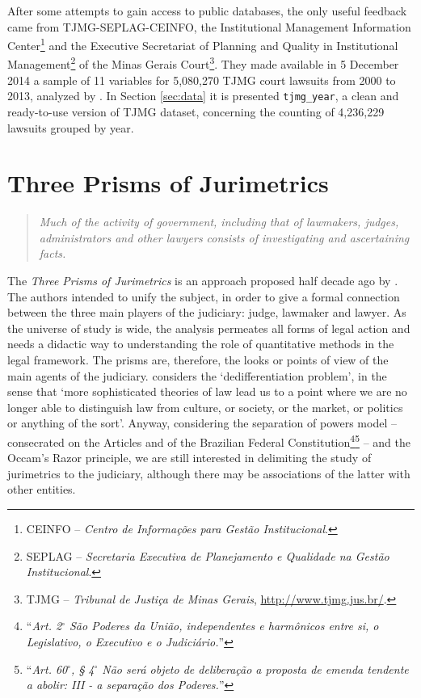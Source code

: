 \documentclass[a4paper]{exam}
\theoremstyle{plain}
\begin{document}
After some attempts to gain access to public databases, the only useful feedback came from TJMG-SEPLAG-CEINFO, the Institutional Management Information Center\footnote{ CEINFO -- \textit{Centro de Informações para Gestão Institucional}.} and the Executive Secretariat of Planning and Quality in Institutional Management\footnote{ SEPLAG -- \textit{Secretaria Executiva de Planejamento e Qualidade na Gestão Institucional}.} of the Minas Gerais Court\footnote{ TJMG -- \textit{Tribunal de Justiça de Minas Gerais}, \url{http://www.tjmg.jus.br/}.}. They made available in 5 December 2014 a sample of 11 variables for 5,080,270 TJMG court lawsuits from 2000 to 2013, analyzed by \cite{oliveira2014jurimetria}. In Section \ref{sec:data} it is presented \texttt{tjmg\_year}, a clean and ready-to-use version of TJMG dataset, concerning the counting of 4,236,229 lawsuits grouped by year.

\section{Three Prisms of Jurimetrics}

\begin{quote}
\textit{Much of the activity of government, including that of lawmakers, judges, administrators and other lawyers consists of investigating and ascertaining facts.} \cite[p. 535]{loevinger1966law}
\end{quote}

The \textit{Three Prisms of Jurimetrics} is an approach proposed half decade ago by \cite{zabala2014jurimetria}. The authors intended to unify the subject, in order to give a formal connection between the three main players of the judiciary: judge, lawmaker and lawyer. As the universe of study is wide, the analysis permeates all forms of legal action and needs a didactic way to understanding the role of quantitative methods in the legal framework. The prisms are, therefore, the looks or points of view of the main agents of the judiciary. \cite{schlag2009dedifferentiation} considers the `dedifferentiation problem', in the sense that `more sophisticated theories of law lead us to a point where we are no longer able to distinguish law from culture, or society, or the market, or politics or anything of the sort'. Anyway, considering the separation of powers model -- consecrated on the Articles  and  of the Brazilian Federal Constitution\footnote{``\textit{Art. 2$^{\circ}$ São Poderes da União, independentes e harmônicos entre si, o Legislativo, o Executivo e o Judiciário.}''}\footnote{``\textit{Art. 60$^{\circ}$, § 4$^{\circ}$ Não será objeto de deliberação a proposta de emenda tendente a abolir: III -  a separação dos Poderes.}''} \cite{brasil988constituicao} -- and the Occam's Razor principle, we are still interested in delimiting the study of jurimetrics to the judiciary, although there may be associations of the latter with other entities.
\end{document}
